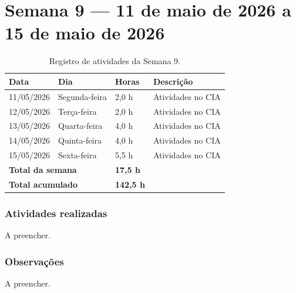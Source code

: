 
\section{Semana 9 --- 11 de maio de 2026 a 15 de maio de 2026}

\begin{table}[H]
\centering
\caption{Registro de atividades da Semana 9.}
\begin{tabular}{llll}
\toprule
\textbf{Data} & \textbf{Dia} & \textbf{Horas} & \textbf{Descrição} \\
\midrule
11/05/2026 & Segunda-feira & 2,0 h & Atividades no CIA \\
12/05/2026 & Terça-feira & 2,0 h & Atividades no CIA \\
13/05/2026 & Quarta-feira & 4,0 h & Atividades no CIA \\
14/05/2026 & Quinta-feira & 4,0 h & Atividades no CIA \\
15/05/2026 & Sexta-feira & 5,5 h & Atividades no CIA \\
\midrule
\multicolumn{2}{l}{\textbf{Total da semana}} & \textbf{17,5 h} & \\
\multicolumn{2}{l}{\textbf{Total acumulado}} & \textbf{142,5 h} & \\
\bottomrule
\end{tabular}
\end{table}

\subsubsection*{Atividades realizadas}

A preencher.

\subsubsection*{Observações}

A preencher.
